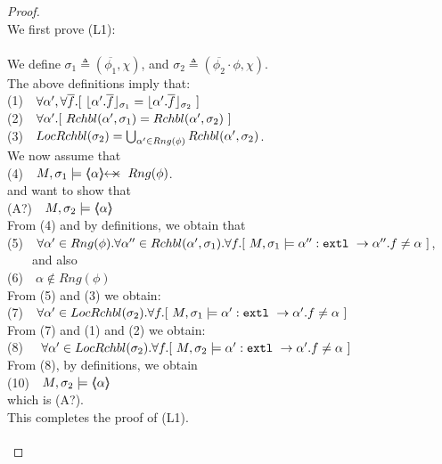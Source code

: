 \begin{proof}
$~$ \\
We first prove (L1): \\
~ \\
We define $\sigma_1 \triangleq (\overline {\phi_1},\chi)$, and  $\sigma_2 \triangleq (\overline {\phi_2}\cdot \phi,\chi) $.\\
The above definitions imply that: \\
\SP (1)\ \ $\forall \alpha',\forall \overline f.[\  \interpret {\sigma_1} {\alpha'.\overline f} =  \interpret {\sigma_2} {\alpha'.\overline f}\ ]$\\
\SP (2)\ \ $\forall \alpha'.[\  \Relevant {\alpha'} {\sigma_1} = \Relevant {\alpha'} {\sigma_2}\ ]$\\
\SP (3)\ \ $\LRelevantO {\sigma_2} = \bigcup_{\alpha'\in Rng(\phi)} \Relevant {\alpha'} {\sigma_2} $.\\
We now assume that\\
\SP (4)\ \ $M, \sigma_1 \models \protectedFrom \alpha {Rng(\phi)}$.\\
and want to show that\\
\SP (A?)\ \ $M, \sigma_2 \models \inside \alpha$\\
From (4) and  by definitions, we obtain that\\
\SP (5)\ \ $\forall \alpha'\in Rng(\phi).\forall \alpha''\in \Relevant {\alpha'} {\sigma_1}.\forall f.[ \   M, \sigma_1 \models \alpha'':\prg{extl}\ \rightarrow \alpha''.f  \neq \alpha\ ]$, \ \ \ \ and also\\
\SP (6)\ \ $\alpha \notin Rng(\phi)$\\
From (5) and (3) we obtain:\\
\SP (7)\ \  $\forall \alpha' \in \LRelevantO {\sigma_2}.\forall f.[ \   M, \sigma_1 \models \alpha':\prg{extl}\ \rightarrow \alpha'.f  \neq \alpha\ ]$\\
From (7) and (1) and (2) we obtain:\\
\SP (8) \ \  $\forall \alpha' \in \LRelevantO {\sigma_2}.\forall f.[ \   M, \sigma_2 \models \alpha':\prg{extl}\ \rightarrow \alpha'.f  \neq \alpha\ ]$\\
From (8), by definitions, we obtain\\
 \SP (10)\ \ $M, \sigma_2 \models \inside \alpha$\\
which is (A?).\\
 This completes the proof of (L1).
 \\
  $\strut ~ \ $\\

\end{proof}
